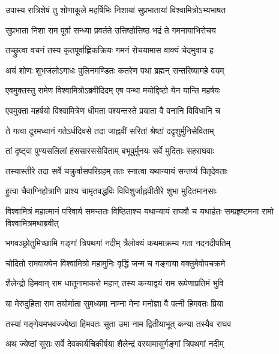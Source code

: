 
\twolineshloka
{उपास्य रात्रिशेषं तु शोणाकूले महर्षिभिः}
{निशायां सुप्रभातायां विश्वामित्रोऽभ्यभाषत} %

\twolineshloka
{सुप्रभाता निशा राम पूर्वा सन्ध्या प्रवर्तते}
{उत्तिष्ठोत्तिष्ठ भद्रं ते गमनायाभिरोचय} %

\twolineshloka
{तच्छ्रुत्वा वचनं तस्य कृतपूर्वाह्णिकक्रियः}
{गमनं रोचयामास वाक्यं चेदमुवाच ह} %

\twolineshloka
{अयं शोणः शुभजलोऽगाधः पुलिनमण्डितः}
{कतरेण पथा ब्रह्मन् सन्तरिष्यामहे वयम्} %

\twolineshloka
{एवमुक्तस्तु रामेण विश्वामित्रोऽब्रवीदिदम्}
{एष पन्था मयोद्दिष्टो येन यान्ति महर्षयः} %

\twolineshloka
{एवमुक्ता महर्षयो विश्वामित्रेण धीमता}
{पश्यन्तस्ते प्रयाता वै वनानि विविधानि च} %

\twolineshloka
{ते गत्वा दूरमध्वानं गतेऽर्धदिवसे तदा}
{जाह्नवीं सरितां श्रेष्ठां ददृशुर्मुनिसेविताम्} %

\twolineshloka
{तां दृष्ट्वा पुण्यसलिलां हंससारससेविताम्}
{बभूवुर्मुनयः सर्वे मुदिताः सहराघवाः} %

\twolineshloka
{तस्यास्तीरे तदा सर्वे चक्रुर्वासपरिग्रहम्}
{ततः स्नात्वा यथान्यायं सन्तर्प्य पितृदेवताः} %

\twolineshloka
{हुत्वा चैवाग्निहोत्राणि प्राश्य चामृतवद्धविः}
{विविशुर्जाह्नवीतीरे शुभा मुदितमानसाः} %

\threelineshloka
{विश्वामित्रं महात्मानं परिवार्य समन्ततः}
{विष्ठिताश्च यथान्यायं राघवौ च यथार्हतः}
{सम्प्रहृष्टमना रामो विश्वामित्रमथाब्रवीत्} %

\twolineshloka
{भगवञ्छ्रोतुमिच्छामि गङ्गां त्रिपथगां नदीम्}
{त्रैलोक्यं कथमाक्रम्य गता नदनदीपतिम्} %

\twolineshloka
{चोदितो रामवाक्येन विश्वामित्रो महामुनिः}
{वृद्धिं जन्म च गङ्गाया वक्तुमेवोपचक्रमे} %

\twolineshloka
{शैलेन्द्रो हिमवान् राम धातूनामाकरो महान्}
{तस्य कन्याद्वयं राम रूपेणाप्रतिमं भुवि} %

\twolineshloka
{या मेरुदुहिता राम तयोर्माता सुमध्यमा}
{नाम्ना मेना मनोज्ञा वै पत्नी हिमवतः प्रिया} %

\twolineshloka
{तस्यां गङ्गेयमभवज्ज्येष्ठा हिमवतः सुता}
{उमा नाम द्वितीयाभूत् कन्या तस्यैव राघव} %

\twolineshloka
{अथ ज्येष्ठां सुराः सर्वे देवकार्यचिकीर्षया}
{शैलेन्द्रं वरयामासुर्गङ्गां त्रिपथगां नदीम्} %

